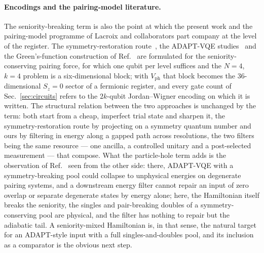 \documentclass[
  aps,            %
  prc,            %
  reprint,        %
  superscriptaddress,
  floatfix,
  nofootinbib
]{revtex4-2}
\newcommand{\Vph}{V_{\mathrm{ph}}}
\begin{document}
\paragraph{Encodings and the pairing-model literature.}
The seniority-breaking term is also the point at which the present work and
the pairing-model programme of Lacroix and collaborators part company at the
level of the register.  The symmetry-restoration
route~\cite{Lacroix2020,RuizGuzman2022,RuizGuzman2023,RuizGuzman2024,Lacroix2023EPJA},
the ADAPT-VQE studies~\cite{Zhang2024,Zhang2025} and the Green's-function
construction of Ref.~\cite{AychetClaisse2026} are formulated for the
seniority-conserving pairing force, for which one qubit per level suffices
and the $N=4$, $k=4$ problem is a six-dimensional block; with $\Vph$ that
block becomes the $36$-dimensional $S_z=0$ sector of a fermionic register,
and every gate count of Sec.~\ref{sec:circuits} refers to the $2k$-qubit
Jordan--Wigner encoding on which it is written.  The structural relation
between the two approaches is unchanged by the term: both start from a
cheap, imperfect trial state and sharpen it, the symmetry-restoration route
by projecting on a symmetry quantum number and ours by filtering in energy
along a gapped path across resolutions, the two filters being the same
resource --- one ancilla, a controlled unitary and a post-selected
measurement --- that compose.  What the particle-hole term adds is the
observation of Ref.~\cite{Zhang2024} seen from the other side: there,
ADAPT-VQE with a symmetry-breaking pool could collapse to unphysical
energies on degenerate pairing systems, and a downstream energy filter
cannot repair an input of zero overlap or separate degenerate states by
energy alone; here, the Hamiltonian itself breaks the seniority, the
singles and pair-breaking doubles of a symmetry-conserving pool are
physical, and the filter has nothing to repair but the adiabatic tail.  A
seniority-mixed Hamiltonian is, in that sense, the natural target for an
ADAPT-style input with a full singles-and-doubles pool, and its inclusion as
a comparator is the obvious next step.
\end{document}
